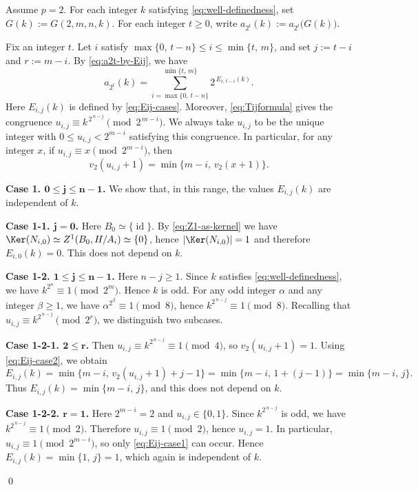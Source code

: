 \documentclass[onecolumn]{article}
\makeatletter
\numberwithin{equation}{section}
\theoremstyle{mytheoremstyle}
\renewenvironment{proof}[1][\proofname]{%
  \par\normalfont 
  \topsep6pt\relax 
  \trivlist\item[\hskip\labelsep\itshape #1\@addpunct{.}]\ignorespaces
}{%
  \qed\endtrivlist\@endpefalse
}
\DeclareMathOperator{\id}{\mathrm{id}}
\makeatother
\begin{document}
\begin{proof}
Assume $p=2$.
For each integer $k$ satisfying \eqref{eq:well-definedness}, set $G(k):=G(2,m,n,k)$.
For each integer $t\ge 0$, write $a_{2^{t}}(k):=a_{2^{t}}\bigl(G(k)\bigr)$.

Fix an integer $t$.
Let $i$ satisfy $\max\{0,\,t-n\}\le i\le \min\{t,\,m\}$, and set $j:=t-i$ and $r:=m-i$.
By \eqref{eq:a2t-by-Eij}, we have
\[
  a_{2^{t}}(k)
  =
  \sum_{i=\max\{0,\,t-n\}}^{\min\{t,\,m\}}
    2^{\,E_{i,\,t-i}(k)}.
\]
Here $E_{i,j}(k)$ is defined by \eqref{eq:Eij-cases}.
Moreover, \eqref{eq:Tijformula} gives the congruence $
  u_{i,j}\equiv k^{\,2^{\,n-j}}\pmod{2^{\,m-i}}$.
We always take $u_{i,j}$ to be the unique integer with
$0\le u_{i,j}<2^{m-i}$ satisfying this congruence.
In particular, for any integer $x$, if $u_{i,j}\equiv x \pmod{2^{m-i}}$, then
\begin{equation}\label{eq:v2-reduction-uij}
  v_2(u_{i,j}+1)=\min\{m-i,\,v_2(x+1)\}.
\end{equation}


\medskip
\noindent
\textbf{Case 1. $\bm{0\le j\le n-1}$.}
We show that, in this range, the values $E_{i,j}(k)$ are independent of $k$.

\medskip\noindent
\textbf{Case 1-1. $\bm{j=0}$.}
Here $B_{0}\simeq\{\id\}$.
By \eqref{eq:Z1-as-kernel} we have $\Ker(N_{i,0})
  \simeq Z^{1}(B_{0},H/A_{i})
  \simeq\{0\}$, 
hence $|\Ker(N_{i,0})|=1$ and therefore $E_{i,0}(k)=0$.
This does not depend on $k$.

\medskip\noindent
\textbf{Case 1-2. $\bm{1\le j\le n-1}$.}
Here $n-j\ge 1$.
Since $k$ satisfies \eqref{eq:well-definedness}, we have $k^{2^{n}}\equiv 1\pmod{2^{m}}$.
Hence $k$ is odd.
For any odd integer $\alpha$ and any integer $\beta\ge 1$, we have
$\alpha^{2^{\beta}}\equiv 1\pmod 8$, hence $k^{2^{\,n-j}}\equiv 1\pmod 8$.
Recalling that $u_{i,j}\equiv k^{2^{\,n-j}}\pmod{2^{r}}$, we distinguish two subcases.

\medskip\noindent
\textbf{Case 1-2-1. $\bm{2\le r}$.}
Then $u_{i,j}\equiv k^{2^{\,n-j}}\equiv 1\pmod 4$, so $v_{2}(u_{i,j}+1)=1$.
Using \eqref{eq:Eij-case2}, we obtain
\[
  E_{i,j}(k)
  =
  \min\{m-i,\,v_{2}(u_{i,j}+1)+j-1\}
  =
  \min\{m-i,\,1+(j-1)\}
  =
  \min\{m-i,\,j\}.
\]
Thus $E_{i,j}(k)=\min\{m-i,\,j\}$, and this does not depend on $k$.

\medskip\noindent
\textbf{Case 1-2-2. $\bm{r=1}$.}
Here $2^{m-i}=2$ and $u_{i,j}\in\{0,1\}$.
Since $k^{2^{\,n-j}}$ is odd, we have $k^{2^{\,n-j}}\equiv 1\pmod 2$.
Therefore $u_{i,j}\equiv 1\pmod 2$, hence $u_{i,j}=1$.
In particular, $u_{i,j}\equiv 1\pmod{2^{m-i}}$, so only \eqref{eq:Eij-case1} can occur.
Hence $E_{i,j}(k)=\min\{1,\,j\}=1$, which again is independent of $k$.


\end{proof}
\end{document}
